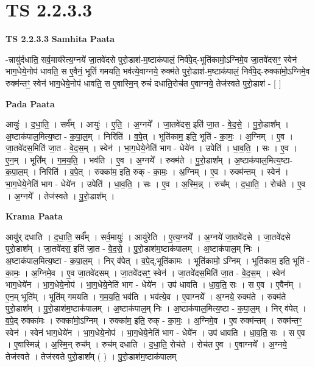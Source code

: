 \documentclass[17pt]{extarticle}
\begin{document}
\section{ TS 2.2.3.3 }

\textbf{TS 2.2.3.3 } \newline
\textbf{Samhita Paata} \newline

-न्नायु॑र्दधाति॒ सर्व॒माय॑रेत्य॒ग्नये॑ जा॒तवे॑दसे पुरो॒डाश॑-म॒ष्टाक॑पालं॒ निर्व॑पे॒द्-भूति॑कामो॒ऽग्निमे॒व जा॒तवे॑दसꣳ॒॒ स्वेन॑ भाग॒धेये॒नोप॑ धावति॒ स ए॒वैनं॒ भूतिं॑ गमयति॒ भव॑त्ये॒वाग्नये॒ रुक्म॑ते पुरो॒डाश॑-म॒ष्टाक॑पालं॒ निर्व॑पे॒द्-रुक्का॑मो॒ऽग्निमे॒व रुक्म॑न्तꣳ॒॒ स्वेन॑ भाग॒धेये॒नोप॑ धावति॒ स ए॒वास्मि॒न् रुचं॑ दधाति॒रोच॑त ए॒वाग्नये॒ तेज॑स्वते पुरो॒डाश॑ - [  ] \newline

\textbf{Pada Paata} \newline

आयुः॑ । द॒धा॒ति॒ । सर्व᳚म् । आयुः॑ । ए॒ति॒ । अ॒ग्नये᳚ । जा॒तवे॑दस॒ इति॑ जा॒त - वे॒द॒से॒ । पु॒रो॒डाश᳚म् । अ॒ष्टाक॑पाल॒मित्य॒ष्टा - क॒पा॒ल॒म् । निरिति॑ । व॒पे॒त् । भूति॑काम॒ इति॒ भूति॑ - का॒मः॒ । अ॒ग्निम् । ए॒व । जा॒तवे॑दस॒मिति॑ जा॒त - वे॒द॒स॒म् । स्वेन॑ । भा॒ग॒धेये॒नेति॑ भाग - धेये॑न । उपेति॑ । धा॒व॒ति॒ । सः । ए॒व । ए॒न॒म् । भूति᳚म् । ग॒म॒य॒ति॒ । भव॑ति । ए॒व । अ॒ग्नये᳚ । रुक्म॑ते । पु॒रो॒डाश᳚म् । अ॒ष्टाक॑पाल॒मित्य॒ष्टा-क॒पा॒ल॒म् । निरिति॑ । व॒पे॒त् । रुक्का॑म॒ इति॒ रुक् - का॒मः॒ । अ॒ग्निम् । ए॒व । रुक्म॑न्तम् । स्वेन॑ । भा॒ग॒धेये॒नेति॑ भाग - धेये॑न । उपेति॑ । धा॒व॒ति॒ । सः । ए॒व । अ॒स्मि॒न्न् । रुच᳚म् । द॒धा॒ति॒ । रोच॑ते । ए॒व । अ॒ग्नये᳚ । तेज॑स्वते । पु॒रो॒डाश᳚म् ।  \newline


\textbf{Krama Paata} \newline

आयु॑र् दधाति । द॒धा॒ति॒ सर्व᳚म् । सर्व॒मायुः॑ । आयु॑रेति । ए॒त्य॒ग्नये᳚ । अ॒ग्नये॑ जा॒तवे॑दसे । जा॒तवे॑दसे पुरो॒डाश᳚म् । जा॒तवे॑दस॒ इति॑ जा॒त - वे॒द॒से॒ । पु॒रो॒डाश॑म॒ष्टाक॑पालम् । अ॒ष्टाक॑पाल॒म् निः । अ॒ष्टाक॑पाल॒मित्य॒ष्टा - क॒पा॒ल॒म् । निर् व॑पेत् । व॒पे॒द्,भूति॑कामः । भूति॑कामो॒ ऽग्निम् । भूति॑काम॒ इति॒ भूति॑ - का॒मः॒ । अ॒ग्निमे॒व । ए॒व जा॒तवे॑दसम् । जा॒तवे॑दसꣳ॒॒ स्वेन॑ । जा॒तवे॑दस॒मिति॑ जा॒त - वे॒द॒स॒म् । स्वेन॑ भाग॒धेये॑न । भा॒ग॒धेये॒नोप॑ । भा॒ग॒धेये॒नेति॑ भाग - धेये॑न । उप॑ धावति । धा॒व॒ति॒ सः । स ए॒व । ए॒वैन᳚म् । ए॒न॒म् भूति᳚म् । भूति॑म् गमयति । ग॒म॒य॒ति॒ भव॑ति । भव॑त्ये॒व । ए॒वाग्नये᳚ । अ॒ग्नये॒ रुक्म॑ते । रुक्म॑ते पुरो॒डाश᳚म् । पु॒रो॒डाश॑म॒ष्टाक॑पालम् । अ॒ष्टाक॑पाल॒म् निः । अ॒ष्टाक॑पाल॒मित्य॒ष्टा - क॒पा॒ल॒म् । निर् व॑पेत् । व॒पे॒द् रुक्का॑मः । रुक्का॑मो॒ऽग्निम् । रुक्का॑म॒ इति॒ रुक् - का॒मः॒ । अ॒ग्निमे॒व । ए॒व रुक्म॑न्तम् । रुक्म॑न्तꣳ॒॒ स्वेन॑ । स्वेन॑ भाग॒धेये॑न । भा॒ग॒धेये॒नोप॑ । भा॒ग॒धेये॒नेति॑ भाग - धेये॑न । उप॑ धावति । धा॒व॒ति॒ सः । स ए॒व । ए॒वास्मिन्न्॑ । अ॒स्मि॒न् रुच᳚म् । रुच॑म् दधाति । द॒धा॒ति॒ रोच॑ते । रोच॑त ए॒व । ए॒वाग्नये᳚ । अ॒ग्नये॒ तेज॑स्वते । तेज॑स्वते पुरो॒डाश᳚म् ( ) । पु॒रो॒डाश॑म॒ष्टाक॑पालम् \newline
\end{document}
